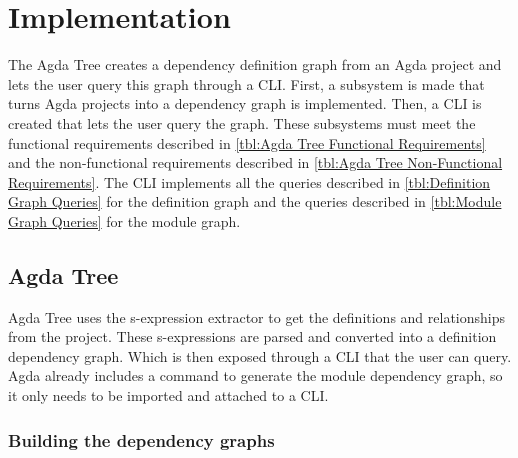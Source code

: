 
\chapter{Implementation} \label{ch:implementation}

The Agda Tree creates a dependency definition graph from an Agda project and
lets the user query this graph through a CLI. First, a subsystem  is made that
turns Agda projects into a dependency graph is implemented. Then, a CLI is
created that lets the user query the graph. These subsystems must meet the
functional requirements described in \cref{tbl:Agda Tree Functional
Requirements} and the non-functional requirements described in \cref{tbl:Agda
Tree Non-Functional Requirements}. The CLI implements all the queries described
in \cref{tbl:Definition Graph Queries} for the definition graph and the queries
described in \cref{tbl:Module Graph Queries} for the module graph.





\section{Agda Tree}

Agda Tree uses the s-expression extractor \cite{andrej} to get the definitions
and relationships from the project. These s-expressions are parsed and
converted into a definition dependency graph. Which is then exposed through a
CLI that the user can query. Agda already includes a command to generate the
module dependency graph, so it only needs to be imported and attached to a CLI.

\subsection{Building the dependency graphs}

